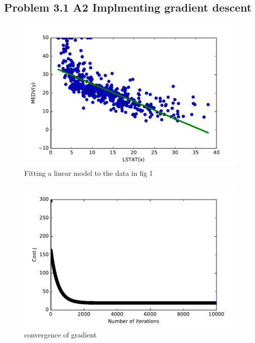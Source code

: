 \documentclass[pdftex,11pt]{article}
\begin{document}
\subsection{Problem 3.1 A2 Implmenting gradient descent}
\begin{figure}
  \caption{Fitting a linear model to the data in fig 1}
  \centering
    \includegraphics[scale=1]{fig2.pdf}
\end{figure}
\begin{figure}
  \caption{convergence of gradient }
  \centering
    \includegraphics[scale=1]{fig4.pdf}
\end{figure}
\end{document}
